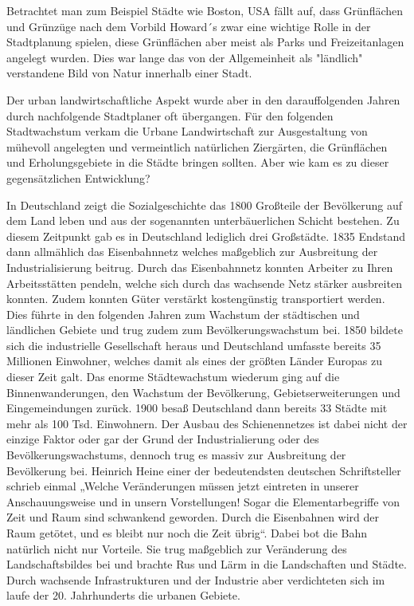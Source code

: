 \documentclass{article}
\begin{document}
Betrachtet man zum Beispiel Städte wie Boston, USA fällt auf, dass Grünflächen und Grünzüge nach dem Vorbild Howard´s zwar eine wichtige Rolle in der Stadtplanung spielen, diese Grünflächen aber meist als Parks und Freizeitanlagen angelegt wurden. Dies war lange das von der Allgemeinheit als "ländlich" verstandene Bild von Natur innerhalb einer Stadt.

Der urban landwirtschaftliche Aspekt wurde aber in den darauffolgenden Jahren durch nachfolgende Stadtplaner oft übergangen. Für den folgenden Stadtwachstum verkam die Urbane Landwirtschaft zur Ausgestaltung von mühevoll angelegten und vermeintlich natürlichen Ziergärten, die Grünflächen und Erholungsgebiete in die Städte bringen sollten. Aber wie kam es zu dieser gegensätzlichen Entwicklung?

In Deutschland zeigt die Sozialgeschichte das 1800 Großteile der Bevölkerung auf dem Land leben und aus der sogenannten unterbäuerlichen Schicht bestehen. Zu diesem Zeitpunkt gab es in Deutschland lediglich drei Großstädte. 1835 Endstand dann allmählich das Eisenbahnnetz welches maßgeblich zur Ausbreitung der Industrialisierung beitrug. Durch das Eisenbahnnetz konnten Arbeiter zu Ihren Arbeitsstätten pendeln, welche sich durch das wachsende Netz stärker ausbreiten konnten. Zudem konnten Güter verstärkt kostengünstig transportiert werden. Dies führte in den folgenden Jahren zum Wachstum der städtischen und ländlichen Gebiete und trug zudem zum Bevölkerungswachstum bei. 1850 bildete sich die industrielle Gesellschaft heraus und Deutschland umfasste bereits 35 Millionen Einwohner, welches damit als eines der größten Länder Europas zu dieser Zeit galt. Das enorme Städtewachstum wiederum ging auf die Binnenwanderungen, den Wachstum der Bevölkerung, Gebietserweiterungen und Eingemeindungen zurück. 1900 besaß Deutschland dann bereits 33 Städte mit mehr als 100 Tsd. Einwohnern. Der Ausbau des Schienennetzes ist dabei nicht der einzige Faktor oder gar der Grund der Industrialierung oder des Bevölkerungswachstums, dennoch trug es massiv zur Ausbreitung der Bevölkerung bei. Heinrich Heine einer der bedeutendsten deutschen Schriftsteller schrieb einmal „Welche Veränderungen müssen jetzt eintreten in unserer Anschauungsweise und in unsern Vorstellungen! Sogar die Elementarbegriffe von Zeit und Raum sind schwankend geworden. Durch die Eisenbahnen wird der Raum getötet, und es bleibt nur noch die Zeit übrig“. Dabei bot die Bahn natürlich nicht nur Vorteile. Sie trug maßgeblich zur Veränderung des Landschaftsbildes bei und brachte Rus und Lärm in die Landschaften und Städte. Durch wachsende Infrastrukturen und der Industrie aber verdichteten sich im laufe der 20. Jahrhunderts die urbanen Gebiete.
\end{document}
